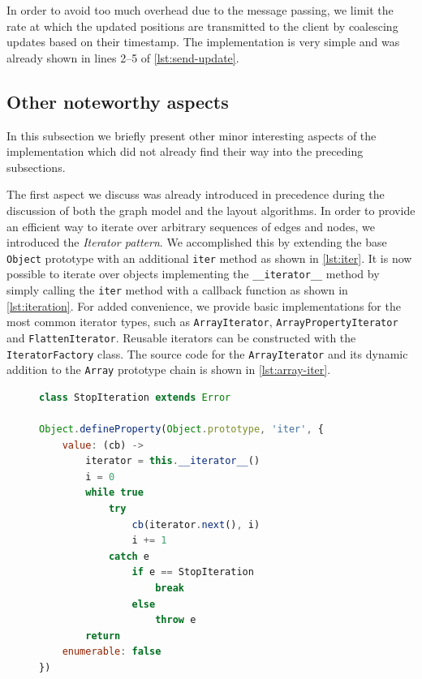 In order to avoid too much overhead due to the message passing, we limit the rate at which the updated positions are transmitted to the client by coalescing updates based on their timestamp. The implementation is very simple and was already shown in lines 2--5 of \vref{lst:send-update}.

\subsection{Other noteworthy aspects}
\label{sec:visu/implementation/other}

In this subsection we briefly present other minor interesting aspects of the implementation which did not already find their way into the preceding subsections.

The first aspect we discuss was already introduced in precedence during the discussion of both the graph model and the layout algorithms. In order to provide an efficient way to iterate over arbitrary sequences of edges and nodes, we introduced the \emph{Iterator pattern}. We accomplished this by extending the base \texttt{Object} prototype with an additional \texttt{iter} method as shown in \vref{lst:iter}. It is now possible to iterate over objects implementing the \texttt{\_\_iterator\_\_} method by simply calling the \texttt{iter} method with a callback function as shown in \vref{lst:iteration}. For added convenience, we provide basic implementations for the most common iterator types, such as \texttt{ArrayIterator}, \texttt{ArrayPropertyIterator} and \texttt{FlattenIterator}. Reusable iterators can be constructed with the \texttt{IteratorFactory} class. The source code for the \texttt{ArrayIterator} and its dynamic addition to the \texttt{Array} prototype chain is shown in \vref{lst:array-iter}.

\begin{figure}
\begin{lstlisting}[caption={Extension of the base prototype with the \texttt{iter} method.},label=lst:iter,language=javascript]
class StopIteration extends Error

Object.defineProperty(Object.prototype, 'iter', {
    value: (cb) ->
        iterator = this.__iterator__()
        i = 0
        while true
            try
                cb(iterator.next(), i)
                i += 1
            catch e
                if e == StopIteration
                    break
                else
                    throw e
        return
    enumerable: false
})
\end{lstlisting}
\end{figure}


